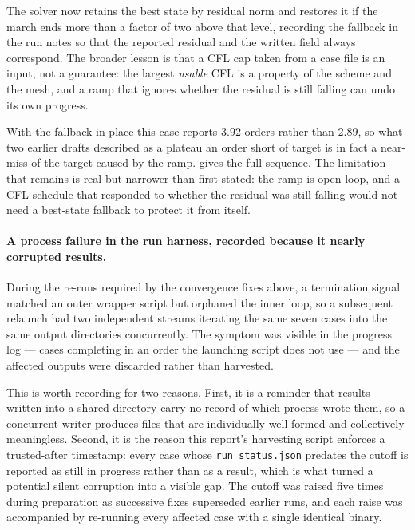The solver now retains the best state by residual norm and restores it if the march
ends more than a factor of two above that level, recording the fallback in the run
notes so that the reported residual and the written field always correspond. The
broader lesson is that a CFL cap taken from a case file is an input, not a
guarantee: the largest \emph{usable} CFL is a property of the scheme and the mesh,
and a ramp that ignores whether the residual is still falling can undo its own
progress.

With the fallback in place this case reports $3.92$ orders rather than $2.89$, so what
two earlier drafts described as a plateau an order short of target is in fact a near-miss
of the target caused by the ramp.  gives the full sequence. The limitation
that remains is real but narrower than first stated: the ramp is open-loop, and a CFL
schedule that responded to whether the residual was still falling would not need a
best-state fallback to protect it from itself.

\paragraph{A process failure in the run harness, recorded because it nearly corrupted
results.} During the re-runs required by the convergence fixes above, a termination
signal matched an outer wrapper script but orphaned the inner loop, so a subsequent
relaunch had two independent streams iterating the same seven cases into the same output
directories concurrently. The symptom was visible in the progress log --- cases completing
in an order the launching script does not use --- and the affected outputs were discarded
rather than harvested.

This is worth recording for two reasons. First, it is a reminder that results written
into a shared directory carry no record of which process wrote them, so a concurrent
writer produces files that are individually well-formed and collectively meaningless.
Second, it is the reason this report's harvesting script enforces a trusted-after
timestamp: every case whose \texttt{run\_status.json} predates the cutoff is reported as
still in progress rather than as a result, which is what turned a potential silent
corruption into a visible gap. The cutoff was raised five times during preparation as
successive fixes superseded earlier runs, and each raise was accompanied by re-running
every affected case with a single identical binary.

